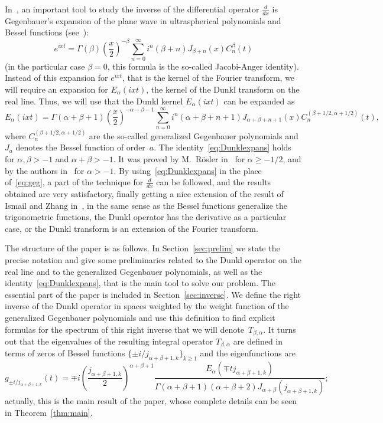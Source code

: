 \documentclass[12pt,a4paper]{amsart}
\theoremstyle{plain}
\theoremstyle{definition}
\begin{document}
In~\cite{IZ}, an important tool to study the inverse of the differential 
operator $\frac{d}{dx}$ is Gegenbauer's expansion of the plane wave in 
ultraspherical polynomials and Bessel functions 
(see~\cite[\S\,4.8, formula (4.8.3), p.~116]{Ism}):
\begin{equation}
\label{eq:geg}
  e^{ixt} = \Gamma(\beta) \left(\frac{x}{2}\right)^{-\beta}
  \sum_{n = 0}^{\infty} i^{n}(\beta+n)J_{\beta+n}(x)C_{n}^{\beta}(t)
\end{equation}
(in the particular case $\beta=0$, this formula is the so-called
Jacobi-Anger identity). Instead of this expansion for $e^{ixt}$,
that is the kernel of the Fourier transform, we will require an
expansion for $E_{\alpha}(ixt)$, the kernel of the Dunkl transform
on the real line. Thus, we will use that the Dunkl kernel
$E_{\alpha}(ixt)$ can be expanded as
\begin{equation}
\label{eq:Dunklexpans}
  E_\alpha(ixt) = \Gamma(\alpha+\beta+1) \left(\frac{x}{2}\right)^{-\alpha-\beta-1}
  \sum_{n=0}^\infty i^n (\alpha+\beta+n+1)J_{\alpha+\beta+n+1}(x)
  C_n^{(\beta+1/2,\alpha+1/2)}(t),
\end{equation}
where $C_n^{(\beta+1/2,\alpha+1/2)}$ are the so-called generalized
Gegenbauer polynomials and $J_a$ denotes the Bessel function of
order~$a$. The identity~\eqref{eq:Dunklexpans} holds for $\alpha,\beta>-1$ 
and $\alpha+\beta>-1$. It was proved by M.~R\"{o}sler in~\cite{Rosler} 
for $\alpha\ge -1/2$, and by the authors in~\cite{ACV} for $\alpha>-1$. 
By using~\eqref{eq:Dunklexpans} in the place of~\eqref{eq:geg}, a
part of the technique for $\frac{d}{dx}$ can be followed, and the
results obtained are very satisfactory, finally getting a nice
extension of the result of Ismail and Zhang in~\cite{IZ}, in the
same sense as the Bessel functions generalize the trigonometric
functions, the Dunkl operator has the derivative as a particular
case, or the Dunkl transform is an extension of the Fourier
transform.

The structure of the paper is as follows.
In Section~\ref{sec:prelim} we state the precise notation and give some 
preliminaries related to the Dunkl operator on the real line and to the 
generalized Gegenbauer polynomials, as well as the identity~\eqref{eq:Dunklexpans}, 
that is the main tool to solve our problem.
The essential part of the paper is included in Section~\ref{sec:inverse}.
We define the right inverse of the Dunkl operator in spaces weighted by 
the weight function of the generalized Gegenbauer polynomials and use 
this definition to find explicit formulas for the spectrum of this 
right inverse that we will denote~$T_{\beta,\alpha}$. It turns out that 
the eigenvalues of the resulting integral operator $T_{\beta,\alpha}$ 
are defined in terms of zeros of Bessel functions 
$\{\pm i/j_{\alpha+\beta+1,k}\}_{k\ge 1}$ and the eigenfunctions are
\[
  g_{\pm i/j_{\alpha+\beta+1,k}}(t) = \mp i
  \left(\frac{j_{\alpha+\beta+1,k}}{2}\right)^{\alpha+\beta+1}
  \frac{E_\alpha(\mp t j_{\alpha+\beta+1,k})}
    {\Gamma(\alpha+\beta+1)(\alpha+\beta+2)J_{\alpha+\beta}(j_{\alpha+\beta+1,k})};
\]
actually, this is the main result of the paper, whose complete details can be seen 
in Theorem~\ref{thm:main}.
\end{document}
